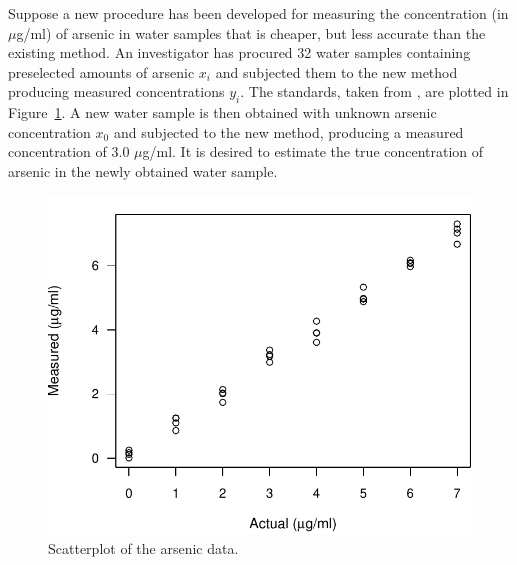 \documentclass[cmfont,usenames,dvipsnames,leqno]{afit-etd}\usepackage[]{graphicx}\usepackage[]{color}
\makeatletter
\def\maxwidth{ %
  \ifdim\Gin@nat@width>\linewidth
    \linewidth
  \else
    \Gin@nat@width
  \fi
}
\newenvironment{knitrout}{}{} %
\renewenvironment{knitrout}{\begin{singlespace}}{\end{singlespace}}
\makeatother
\begin{document}
Suppose a new procedure has been developed for measuring the concentration (in $\mu$g/ml) of arsenic in water samples that is cheaper, but less accurate than the existing method. An investigator has procured 32 water samples containing preselected amounts of arsenic $x_i$ and subjected them to the new method producing measured concentrations $y_i$. The standards, taken from \citet{graybill_regression_1994}, are plotted in Figure~\ref{fig:arsenic-scatter}. A new water sample is then obtained with unknown arsenic concentration $x_0$ and subjected to the new method, producing a measured concentration of 3.0 $\mu$g/ml. It is desired to estimate the true concentration of arsenic in the newly obtained water sample. 

\begin{knitrout}
\color{fgcolor}\begin{figure}[!tbh]

\includegraphics[width=\maxwidth]{figure/arsenic-scatter} \caption[Scatterplot of the arsenic data]{Scatterplot of the arsenic data.\label{fig:arsenic-scatter}}
\end{figure}


\end{knitrout}
\end{document}
